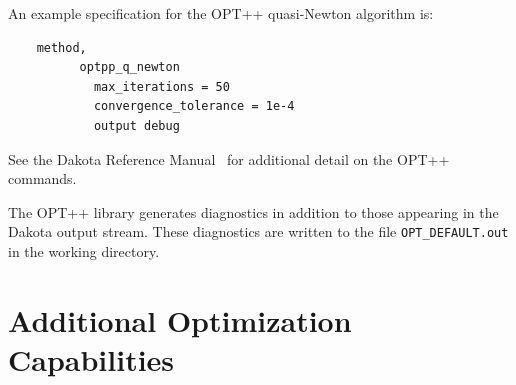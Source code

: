 An example specification for the OPT++ quasi-Newton algorithm is:
\begin{small}
\begin{verbatim}
    method,
          optpp_q_newton
            max_iterations = 50
            convergence_tolerance = 1e-4
            output debug
\end{verbatim}
\end{small}

See the Dakota Reference Manual~\cite{RefMan} for additional detail on the
OPT++ commands.

The OPT++ library generates diagnostics in addition to those appearing
in the Dakota output stream. These diagnostics are written to the file
\texttt{OPT\_DEFAULT.out} in the working directory.





\section{Additional Optimization Capabilities}\label{opt:additional}


